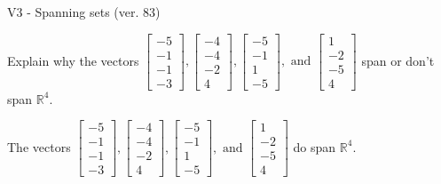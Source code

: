 \begin{exercise}
  \begin{exerciseTitle}V3 - Spanning sets (ver. 83)\end{exerciseTitle}
  \begin{exerciseStatement}
    Explain why the vectors \(\left[\begin{array}{r}
-5 \\
-1 \\
-1 \\
-3
\end{array}\right] , \left[\begin{array}{r}
-4 \\
-4 \\
-2 \\
4
\end{array}\right] , \left[\begin{array}{r}
-5 \\
-1 \\
1 \\
-5
\end{array}\right] , \text{ and } \left[\begin{array}{r}
1 \\
-2 \\
-5 \\
4
\end{array}\right]\) span or don't span \(\mathbb{R}^4\). 
	


  \end{exerciseStatement}
  \begin{exerciseAnswer}
   The vectors \(\left[\begin{array}{r}
-5 \\
-1 \\
-1 \\
-3
\end{array}\right] , \left[\begin{array}{r}
-4 \\
-4 \\
-2 \\
4
\end{array}\right] , \left[\begin{array}{r}
-5 \\
-1 \\
1 \\
-5
\end{array}\right] , \text{ and } \left[\begin{array}{r}
1 \\
-2 \\
-5 \\
4
\end{array}\right]\) 
  	 do  
	span \(\mathbb{R}^4\).
  


  \end{exerciseAnswer}
\end{exercise}